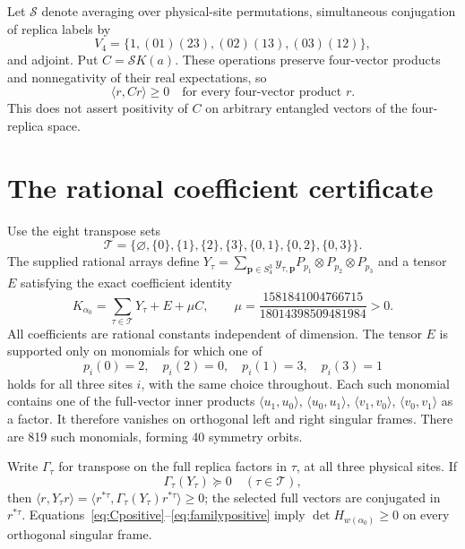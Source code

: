 \documentclass[10pt]{article}
\newcommand{\al}{\alpha_0}
\begin{document}
Let $\mathcal S$ denote averaging over physical-site permutations,
simultaneous conjugation of replica labels by
\[
 V_4=\{1,(01)(23),(02)(13),(03)(12)\},
\]
and adjoint. Put $C=\mathcal S K(a)$. These operations preserve
four-vector products and nonnegativity of their real expectations, so
\begin{equation}\label{eq:Cpositive}
 \langle r,Cr\rangle\ge0
 \quad\text{for every four-vector product $r$.}
\end{equation}
This does not assert positivity of $C$ on arbitrary entangled vectors of the
four-replica space.

\section{The rational coefficient certificate}
Use the eight transpose sets
\[
 \mathcal T=\{\varnothing,\{0\},\{1\},\{2\},\{3\},
                         \{0,1\},\{0,2\},\{0,3\}\}.
\]
The supplied rational arrays define
$Y_\tau=\sum_{\mathbf p\in S_4^3}y_{\tau,\mathbf p}
P_{p_1}\otimes P_{p_2}\otimes P_{p_3}$ and a tensor $E$ satisfying
the exact coefficient identity
\begin{equation}\label{eq:cert}
 K_{\al}=\sum_{\tau\in\mathcal T}Y_\tau+E+\mu C,
 \qquad
 \mu=\frac{1581841004766715}{18014398509481984}>0.
\end{equation}
All coefficients are rational constants independent of dimension.
The tensor $E$ is supported only on monomials for which one of
\[
 p_i(0)=2,\quad p_i(2)=0,\quad p_i(1)=3,\quad p_i(3)=1
\]
holds for all three sites $i$, with the same choice throughout. Each such
monomial contains one of the full-vector inner products
$\langle u_1,u_0\rangle$, $\langle u_0,u_1\rangle$,
$\langle v_1,v_0\rangle$, $\langle v_0,v_1\rangle$ as a factor.
It therefore vanishes on orthogonal left and right singular frames.
There are 819 such monomials, forming 40 symmetry orbits.

Write $\Gamma_\tau$ for transpose on the full replica factors in $\tau$,
at all three physical sites. If
\begin{equation}\label{eq:familypositive}
 \Gamma_\tau(Y_\tau)\succeq0 \quad(\tau\in\mathcal T),
\end{equation}
then $\langle r,Y_\tau r\rangle
=\langle r^{*\tau},\Gamma_\tau(Y_\tau)r^{*\tau}\rangle\ge0$;
the selected full vectors are conjugated in $r^{*\tau}$.
Equations~\eqref{eq:Cpositive}--\eqref{eq:familypositive} imply
$\det H_{w(\al)}\ge0$ on every orthogonal singular frame.
\end{document}
